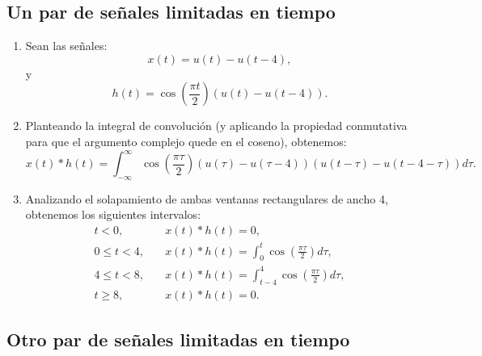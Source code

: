 \documentclass[11pt,a4paper,openany]{book}
\begin{document}
\subsection{Un par de señales limitadas en tiempo}

\begin{enumerate}
	
	\item Sean las señales:
	\begin{equation}
		x(t) = u(t) - u(t-4),
	\end{equation}
	y
	\begin{equation}
		h(t) = \cos\left( \frac{\pi t}{2}\right) \left( u(t) - u(t-4) \right).
	\end{equation}
	
	\item Planteando la integral de convolución (y aplicando la propiedad conmutativa para que el argumento complejo quede en el coseno), obtenemos:
	\begin{equation}
		x(t) * h(t) = \int_{-\infty}^{\infty} \cos\left( \frac{\pi \tau}{2}\right) \left( u(\tau) - u(\tau -4) \right) \left( u(t-\tau) - u(t-4-\tau) \right) d\tau .
	\end{equation}
	
	\item Analizando el solapamiento de ambas ventanas rectangulares de ancho 4, obtenemos los siguientes intervalos:
	\begin{align}
		t < 0, &\quad x(t) * h(t) = 0, \\
		0 \leq t < 4, &\quad x(t) * h(t) = \int_{0}^{t} \cos\left( \frac{\pi \tau}{2}\right) d\tau , \\
		4 \leq t < 8, &\quad x(t) * h(t) = \int_{t-4}^{4} \cos\left( \frac{\pi \tau}{2}\right) d\tau , \\
		t \geq 8, &\quad x(t) * h(t) = 0.
	\end{align}
	
\end{enumerate}

\subsection{Otro par de señales limitadas en tiempo}
\end{document}
